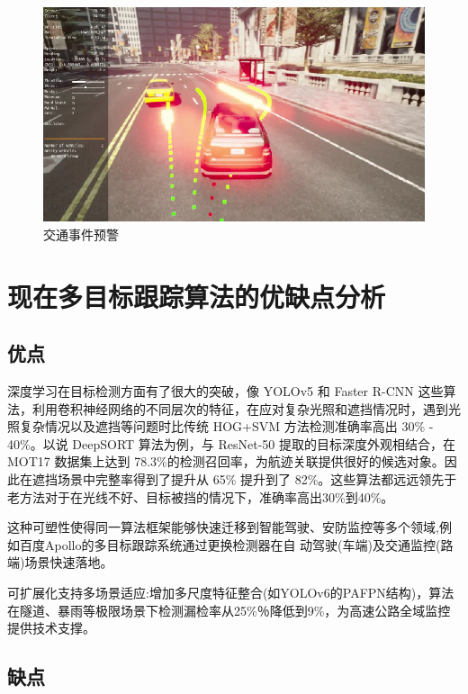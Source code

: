 \begin{figure}[htbp] %
	\centering
	\includegraphics[width=1\textwidth]{p27} %
	\caption{交通事件预警} %
	\label{fig:p27} %
\end{figure}




\section{现在多目标跟踪算法的优缺点分析}

\subsection{优点}
深度学习在目标检测方面有了很大的突破，像 YOLOv5 和 Faster R-CNN 这些算法，利用卷积神经网络的不同层次的特征，在应对复杂光照和遮挡情况时，遇到光照复杂情况以及遮挡等问题时比传统 HOG+SVM 方法检测准确率高出 30\% - 40\%。以说 DeepSORT 算法为例，与 ResNet-50 提取的目标深度外观相结合，在 MOT17 数据集上达到 78.3\%的检测召回率，为航迹关联提供很好的候选对象。因此在遮挡场景中完整率得到了提升从 65\% 提升到了 82\%。这些算法都远远领先于老方法对于在光线不好、目标被挡的情况下，准确率高出30\%到40\%。


这种可塑性使得同一算法框架能够快速迁移到智能驾驶、安防监控等多个领域,例如百度Apollo的多目标跟踪系统通过更换检测器在自 动驾驶(车端)及交通监控(路端)场景快速落地\cite{apollo_tracking}。

可扩展化支持多场景适应:增加多尺度特征整合(如YOLOv6的PAFPN结构)，算法在隧道、暴雨等极限场景下检测漏检率从25\%％降低到9\%，为高速公路全域监控提供技术支撑\cite{spatiotemporal_gnn}。	

\subsection{缺点}


